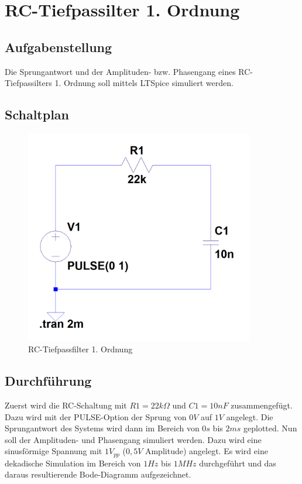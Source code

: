 \documentclass[12pt,a4paper,titlepage]{article}
\begin{document}
\newpage
\section{RC-Tiefpassilter 1. Ordnung}

\subsection{Aufgabenstellung}
Die Sprungantwort und der Amplituden- bzw. Phasengang eines RC-Tiefpassilters 1. Ordnung soll mittels LTSpice simuliert werden.

\subsection{Schaltplan}

\begin{figure}[H]
  \centering
  \includegraphics[width=100mm]{filter01_schaltung.PNG}
  \caption{RC-Tiefpassfilter 1. Ordnung}
\end{figure}

\subsection{Durchführung}
Zuerst wird die RC-Schaltung mit $R1 = 22k\Omega$ und $C1 = 10nF$ zusammengefügt. Dazu wird mit der PULSE-Option der Sprung von $0V$ auf $1V$ angelegt. Die Sprungantwort des Systems wird dann im Bereich von $0s$ bis $2ms$ geplotted. Nun soll der Amplituden- und Phasengang simuliert werden. Dazu wird eine sinusförmige Spannung mit $1V_{pp}$ ($0,5V$ Amplitude) angelegt. Es wird eine dekadische Simulation im Bereich von $1Hz$ bis $1MHz$ durchgeführt und das daraus resultierende Bode-Diagramm aufgezeichnet.
\end{document}
